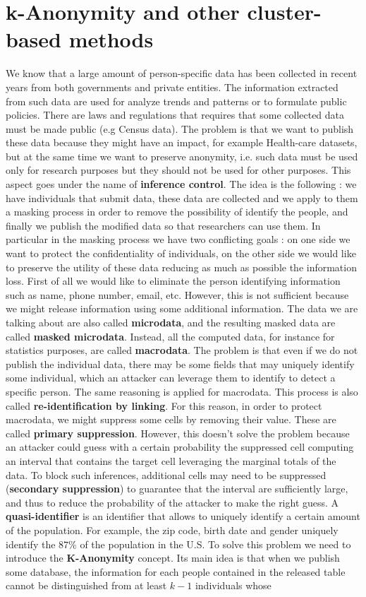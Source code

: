 \section{k-Anonymity and other cluster-based methods}
We know that a large amount of person-specific data has been collected in recent years from both governments and private entities. The information extracted from such data are used for analyze trends and patterns or to formulate public policies. There are laws and regulations that requires that some collected data must be made public (e.g Census data). The problem is that we want to publish these data because they might have an impact, for example Health-care datasets, but at the same time we want to preserve anonymity, i.e. such data must be used only for research purposes but they should not be used for other purposes. This aspect goes under the name of \textbf{inference control}. The idea is the following : we have individuals that submit data, these data are collected and we apply to them a masking process in order to remove the possibility of identify the people, and finally we publish the modified data so that researchers can use them. In particular in the masking process we have two conflicting goals : on one side we want to protect the confidentiality of individuals, on the other side we would like to preserve the utility of these data reducing as much as possible the information loss. First of all we would like to eliminate the person identifying information such as name, phone number, email, etc. However, this is not sufficient because we might release information using some additional information. The data we are talking about are also called \textbf{microdata}, and the resulting masked data are called \textbf{masked microdata}. Instead, all the computed data, for instance for statistics purposes, are called \textbf{macrodata}. The problem is that even if we do not publish the individual data, there may be some fields that may uniquely identify some individual, which an attacker can leverage them to identify to detect a specific person. The same reasoning is applied for macrodata. This process is also called \textbf{re-identification by linking}. For this reason, in order to protect macrodata, we might suppress some cells by removing their value. These are called \textbf{primary suppression}. However, this doesn't solve the problem because an attacker could guess with a certain probability the suppressed cell computing an interval that contains the target cell leveraging the marginal totals of the data. To block such inferences, additional cells may need to be suppressed (\textbf{secondary suppression}) to guarantee that the interval are sufficiently large, and thus to reduce the probability of the attacker to make the right guess. A \textbf{quasi-identifier} is an identifier that allows to uniquely identify a certain amount of the population. For example, the zip code, birth date and gender uniquely identify the $87 \%$ of the population in the U.S. To solve this problem we need to introduce the \textbf{K-Anonymity} concept. Its main idea is that when we publish some database, the information for each people contained in the released table cannot be distinguished from at least $k - 1$ individuals whose 